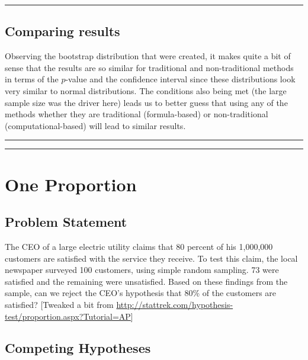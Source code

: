 \documentclass[]{tufte-book}
\let\oldrule=\rule
\renewcommand{\rule}[1]{\oldrule{\linewidth}}
\begin{document}
\begin{center}\rule{0.5\linewidth}{\linethickness}\end{center}

\subsection{Comparing results}\label{comparing-results}

Observing the bootstrap distribution that were created, it makes quite a
bit of sense that the results are so similar for traditional and
non-traditional methods in terms of the \(p\)-value and the confidence
interval since these distributions look very similar to normal
distributions. The conditions also being met (the large sample size was
the driver here) leads us to better guess that using any of the methods
whether they are traditional (formula-based) or non-traditional
(computational-based) will lead to similar results.

\begin{center}\rule{0.5\linewidth}{\linethickness}\end{center}

\begin{center}\rule{0.5\linewidth}{\linethickness}\end{center}

\section{One Proportion}\label{one-proportion}

\subsection{Problem Statement}\label{problem-statement-1}

The CEO of a large electric utility claims that 80 percent of his
1,000,000 customers are satisfied with the service they receive. To test
this claim, the local newspaper surveyed 100 customers, using simple
random sampling. 73 were satisfied and the remaining were unsatisfied.
Based on these findings from the sample, can we reject the CEO's
hypothesis that 80\% of the customers are satisfied? {[}Tweaked a bit
from
\url{http://stattrek.com/hypothesis-test/proportion.aspx?Tutorial=AP}{]}

\subsection{Competing Hypotheses}\label{competing-hypotheses-1}
\end{document}
